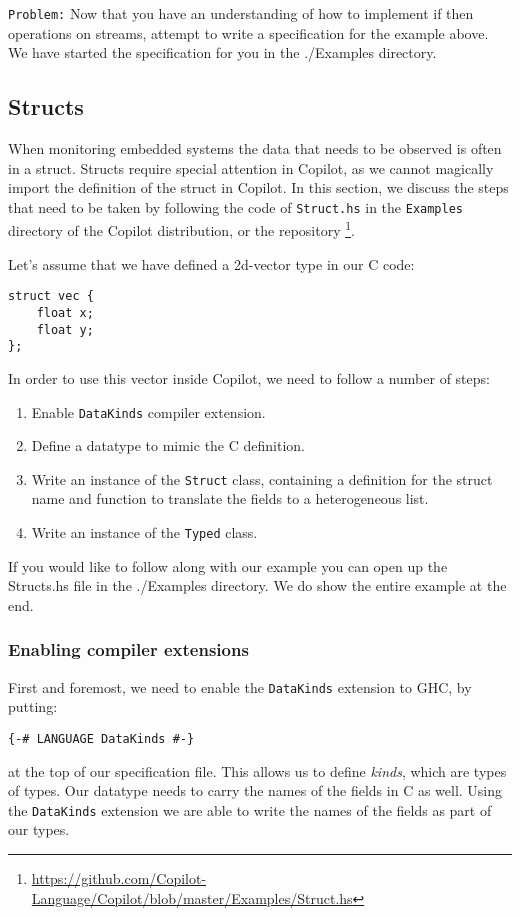 {\tt Problem:} Now that you have an understanding of how to implement if then
operations on streams, attempt to write a specification for the example above.
%
We have started the specification for you in the ./Examples directory.




\subsection{Structs}
When monitoring embedded systems the data that needs to be observed is often in a struct.
Structs require special attention in Copilot, as we cannot magically
import the definition of the struct in Copilot. In this section, we discuss the
steps that need to be taken by following the code of \texttt{Struct.hs} in the
\texttt{Examples} directory of the Copilot distribution, or the repository
\footnote{\url{https://github.com/Copilot-Language/Copilot/blob/master/Examples/Struct.hs}}.

Let's assume that we have defined a 2d-vector type in our C code:
\begin{lstlisting}
struct vec {
	float x;
	float y;
};
\end{lstlisting}
In order to use this vector inside Copilot, we need to follow a number
of steps:
\begin{enumerate}
  \item Enable \texttt{DataKinds} compiler extension.
  \item Define a datatype to mimic the C definition.
  \item Write an instance of the \texttt{Struct} class, containing a definition
  for the struct name and function to translate the fields to a heterogeneous
    list.
  \item Write an instance of the \texttt{Typed} class.
\end{enumerate}

If you would like to follow along with our example you can open up the Structs.hs file
in the ./Examples directory. We do show the entire example at the end. 

\subsubsection*{Enabling compiler extensions}
First and foremost, we need to enable the \texttt{DataKinds} extension to GHC,
by putting:
\begin{lstlisting}[language=Copilot]
{-# LANGUAGE DataKinds #-}
\end{lstlisting}
at the top of our specification file. This allows us to define \emph{kinds},
which are types of types. Our datatype needs to carry the names of the
fields in C as well. Using the \texttt{DataKinds} extension we are able to
write the names of the fields as part of our types.


